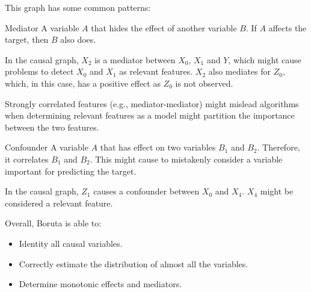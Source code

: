 This graph has some common patterns:
\begin{descriptionlist}
    \item[Mediator] 
        A variable $A$ that hides the effect of another variable $B$. If $A$ affects the target, then $B$ also does.

    \begin{example}
        In the causal graph, $X_2$ is a mediator between $X_0$, $X_1$ and $Y$, which might cause problems to detect $X_0$ and $X_1$ as relevant features. $X_2$ also mediates for $Z_0$, which, in this case, has a positive effect as $Z_0$ is not observed.
    \end{example}

    \begin{remark}
        Strongly correlated features (e.g., mediator-mediator) might mislead algorithms when determining relevant features as a model might partition the importance between the two features.
    \end{remark}

    \item[Confounder]
        A variable $A$ that has effect on two variables $B_1$ and $B_2$. Therefore, it correlates $B_1$ and $B_2$. This might cause to mistakenly consider a variable important for predicting the target.

        \begin{example}
            In the causal graph, $Z_1$ causes a confounder between $X_0$ and $X_4$. $X_4$ might be considered a relevant feature.
        \end{example}
\end{descriptionlist}

Overall, Boruta is able to: 
\begin{itemize}
    \item Identity all causal variables.
    \item Correctly estimate the distribution of almost all the variables.
    \item Determine monotonic effects and mediators.
\end{itemize}